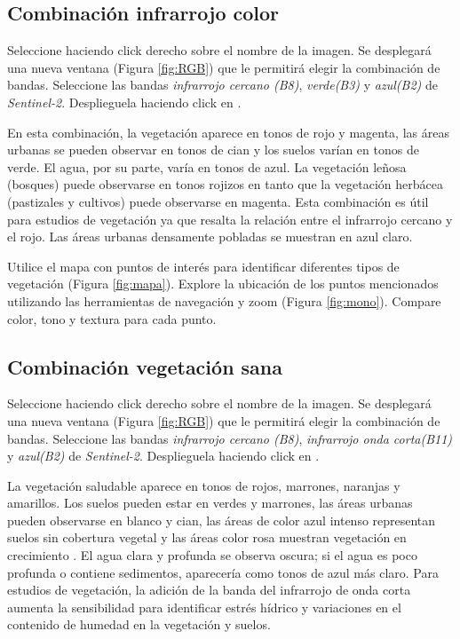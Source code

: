 \subsection{Combinación infrarrojo color}
\label{sec:infrarrojocolor}

Seleccione  haciendo click derecho sobre el nombre de la imagen. Se desplegará una nueva ventana (Figura \ref{fig:RGB}) que le permitirá elegir la combinación de bandas. Seleccione las bandas \emph{infrarrojo cercano (B8)}, \emph{verde(B3)} y \emph{azul(B2)} de \emph{Sentinel-2}. Desplieguela haciendo click en .

En esta combinación, la vegetación aparece en tonos de rojo y magenta, las áreas urbanas se pueden observar en tonos de cian y los suelos varían en tonos de verde. El agua, por su parte, varía en tonos de azul. La vegetación leñosa (bosques) puede observarse en tonos rojizos en tanto que la vegetación herbácea (pastizales y cultivos) puede observarse en magenta. Esta combinación es útil para estudios de vegetación ya que resalta la relación entre el infrarrojo cercano y el rojo. Las áreas urbanas densamente pobladas se muestran en azul claro.

Utilice el mapa con puntos de interés para identificar diferentes tipos de vegetación (Figura \ref{fig:mapa}). Explore la ubicación de los puntos mencionados utilizando las herramientas de navegación y zoom  (Figura \ref{fig:mono}). Compare color, tono y textura para cada punto.

\subsection{Combinación vegetación sana}
\label{sec:vegetacionsana}

Seleccione  haciendo click derecho sobre el nombre de la imagen. Se desplegará una nueva ventana (Figura \ref{fig:RGB}) que le permitirá elegir la combinación de bandas. Seleccione las bandas \emph{infrarrojo cercano (B8)}, \emph{infrarrojo onda corta(B11)} y \emph{azul(B2)} de \emph{Sentinel-2}. Desplieguela haciendo click en .

La vegetación saludable aparece en tonos de rojos, marrones, naranjas y amarillos. Los suelos pueden estar en verdes y marrones, las áreas urbanas pueden observarse en blanco y cian, las áreas de color azul intenso representan suelos sin cobertura vegetal y las áreas color rosa muestran vegetación en crecimiento . El agua clara y profunda se observa oscura; si el agua es poco profunda o contiene sedimentos, aparecería como tonos de azul más claro. Para estudios de vegetación, la adición de la banda del infrarrojo de onda corta aumenta la sensibilidad para identificar estrés hídrico y variaciones en el contenido de humedad en la vegetación y suelos.

